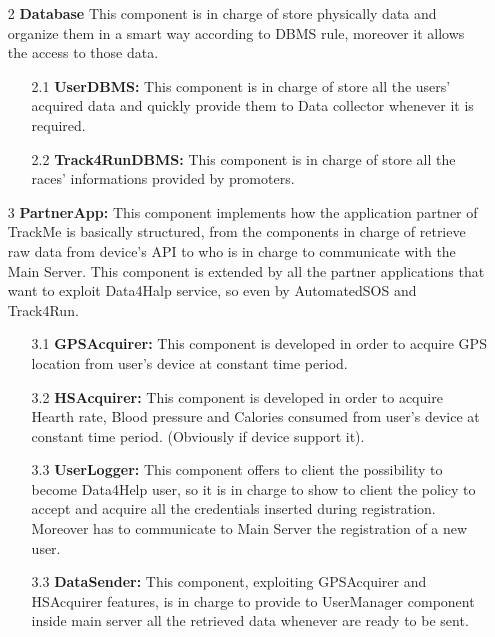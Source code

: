 \begin{enumerate}
\item [2] \textbf{Database} 
This component is in charge of store physically data and organize them in a smart way according to DBMS rule, moreover it allows the access to those data.

	\begin{enumerate}
	\item [2.1]\textbf{UserDBMS: }
	This component is in charge of store all the users’ acquired data and quickly provide them to Data collector whenever it is required.
	
	\item [2.2]\textbf{Track4RunDBMS: }
	This component is in charge of store all the races' informations provided by promoters.

	
	\end{enumerate}
	
\item [3]\textbf{PartnerApp: }
This component implements how the application partner of TrackMe is basically structured, from the components in charge of retrieve raw data from device's API to who is in charge to communicate with the Main Server. This component is extended by all the partner applications that want to exploit Data4Halp service, so even by AutomatedSOS and Track4Run.

	\begin{enumerate}
	\item [3.1]\textbf{GPSAcquirer:}
	This component is developed in order to acquire GPS location from user's device at constant time period.
	
	\item [3.2]\textbf{HSAcquirer:}
	This component is developed in order to acquire Hearth rate, Blood pressure and Calories consumed from user's device at constant time period. (Obviously if device support it). 
	
	\item [3.3]\textbf{UserLogger:}
	 This component offers to client the possibility to become Data4Help user, so it is in charge to show to client the policy to accept and acquire all the credentials inserted during registration. Moreover has to communicate to Main Server the registration of a new user.
	 
	\item [3.3]\textbf{DataSender:}
	This component, exploiting GPSAcquirer and HSAcquirer features, is in charge to provide to UserManager component inside main server all the retrieved data whenever are ready to be sent.
	\end{enumerate}


\end{enumerate}
